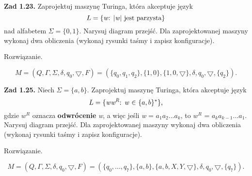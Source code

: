 \documentclass[12pt]{article}
\begin{document}
\newpage

\noindent\textbf{Zad 1.23.} Zaprojektuj maszynę Turinga, która akceptuje język
\[L=\{\text{\textit{w}: |\textit{w}| jest parzysta}\}\]
nad alfabetem $\Sigma=\{0,1\}$. Narysuj diagram przejść. Dla zaprojektowanej maszyny wykonaj dwa obliczenia (wykonaj rysunki taśmy i zapisz konfiguracje).

 Rozwiązanie.
 
\[M=(Q,\Gamma,\Sigma,\delta,q_0,\bigtriangledown,F)=(\{q_0,q_1,q_2\},\{1,0\},\{1,0,\bigtriangledown\},\delta,q_0,\bigtriangledown,\{q_2\}).\]

\vspace{20pt}

\begin{center}
\end{center}

\newpage

\noindent\textbf{Zad 1.25.} Niech $\Sigma=\{a,b\}$. Zaprojektuj maszynę Turinga, która akceptuje język
\[L=\{\text{\textit{w}${\textit{w}^\textit{R}}$: \textit{w} $\in$ $\{a,b\}^*$\},}\]
gdzie ${\textit{w}^\textit{R}}$ oznacza \textbf{odwrócenie} \textit{w},  a  więc  jeśli \textit{w} = $a_1a_2...a_k$, to ${\textit{w}^\textit{R}}$ = $a_ka_{k-1}...a_1$. Narysuj  diagram  przejść. Dla  zaprojektowanej  maszyny  wykonaj dwa obliczenia (wykonaj rysunki taśmy i zapisz konfiguracje).

 Rozwiązanie.
 
\[M=(Q,\Gamma,\Sigma,\delta,q_0,\bigtriangledown,F)=(\{q_0,...,q_7\},\{a,b\},\{a,b,X,Y,\bigtriangledown\},\delta,q_0,\bigtriangledown,\{q_7\}).\]
\end{document}
